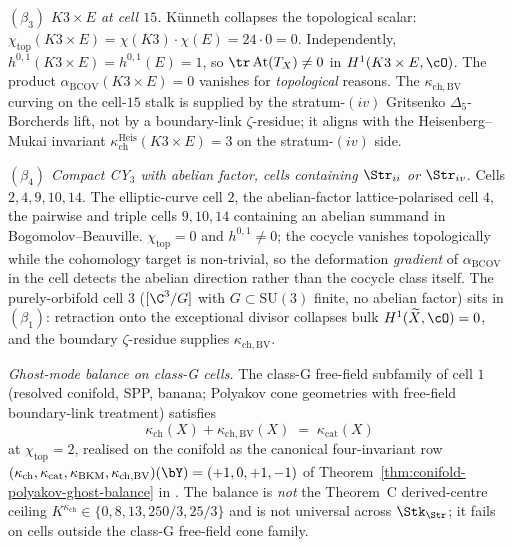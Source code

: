 \emph{$(\beta_3)$ $K3\times E$ at cell $15$.} Künneth collapses the
topological scalar: $\chi_{\mathrm{top}}(K3\times E)=\chi(K3)\cdot
\chi(E)=24\cdot 0=0$. Independently,
$h^{0,1}(K3\times E)=h^{0,1}(E)=1$, so $\tr\,\mathrm{At}(T_X)\neq
0$ in $H^1(K3\times E,\cO)$. The product
$\alpha_{\mathrm{BCOV}}(K3\times E)=0$ vanishes for
\emph{topological} reasons. The $\kappa_{\mathrm{ch,BV}}$ curving
on the cell-$15$ stalk is supplied by the stratum-$(iv)$ Gritsenko
$\Delta_5$-Borcherds lift, not by a boundary-link $\zeta$-residue;
it aligns with the Heisenberg--Mukai invariant
$\kappa_{\mathrm{ch}}^{\mathrm{Heis}}(K3\times E)=3$ on the
stratum-$(iv)$ side.

\emph{$(\beta_4)$ Compact CY$_3$ with abelian factor, cells
containing $\Str_{ii}$ or $\Str_{iv}$.} Cells $2, 4, 9, 10, 14$.
The elliptic-curve cell $2$, the abelian-factor lattice-polarised
cell $4$, the pairwise and triple cells $9, 10, 14$ containing an
abelian summand in Bogomolov--Beauville.
$\chi_{\mathrm{top}}=0$ and $h^{0,1}\neq 0$; the cocycle vanishes
topologically while the cohomology target is non-trivial, so the
deformation \emph{gradient} of $\alpha_{\mathrm{BCOV}}$ in the cell
detects the abelian direction rather than the cocycle class
itself. The purely-orbifold cell $3$ ($[\C^3/G]$ with $G\subset
\mathrm{SU}(3)$ finite, no abelian factor) sits in $(\beta_1)$:
retraction onto the exceptional divisor collapses bulk
$H^1(\widetilde{X},\cO)=0$, and the boundary $\zeta$-residue
supplies $\kappa_{\mathrm{ch,BV}}$.

\emph{Ghost-mode balance on class-G cells.} The class-G free-field
subfamily of cell $1$ (resolved conifold, SPP, banana; Polyakov
cone geometries with free-field boundary-link treatment) satisfies
\[
 \kappa_{\mathrm{ch}}(X) + \kappa_{\mathrm{ch,BV}}(X)
 \;=\; \kappa_{\mathrm{cat}}(X)
\]
at $\chi_{\mathrm{top}}=2$, realised on the conifold as the
canonical four-invariant row
$(\kappa_{\mathrm{ch}},\kappa_{\mathrm{cat}},
\kappa_{\mathrm{BKM}},\kappa_{\mathrm{ch,BV}})(\bY)=
(+1,0,+1,-1)$ of
Theorem~\ref{thm:conifold-polyakov-ghost-balance} in
\cite{VolI}. The balance is
\emph{not} the Theorem~C derived-centre ceiling
$K^{\kappa_{\mathrm{ch}}}\in\{0,8,13,250/3,25/3\}$ and is not universal across
$\Stk_{\Str}$; it fails on cells outside the class-G free-field
cone family.

